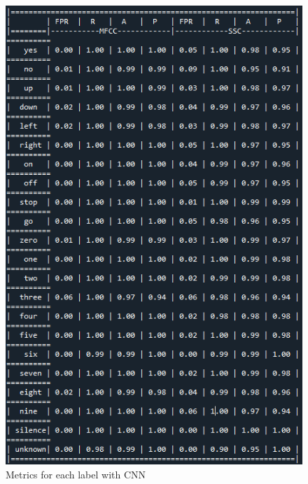 \begin{appendices}
\begin{figure}[h!]
    \includegraphics[width=1\textwidth]{chapters/pictures/table_cnn.PNG}
    \caption{Metrics for each label with CNN}
    \label{fig:table_cnn}
\end{figure}
\newpage
\begin{figure}[h!]
    \centering

\end{figure}
\end{appendices}
